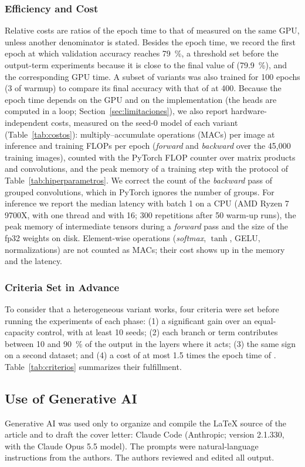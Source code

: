 \subsubsection{Efficiency and Cost} Relative costs are ratios of the epoch time to that of  measured on the same GPU, unless another denominator is stated. Besides the epoch time, we record the first epoch at which validation accuracy reaches 79~\%, a threshold set before the output-term experiments because it is close to the final value of  (79.9~\%), and the corresponding GPU time. A subset of variants was also trained for 100 epochs (3 of warmup) to compare its final accuracy with that of  at 400. Because the epoch time depends on the GPU and on the implementation (the heads are computed in a loop; Section~\ref{sec:limitaciones}), we also report hardware-independent costs, measured on the seed-0 model of each variant (Table~\ref{tab:costos}): multiply--accumulate operations (MACs) per image at inference and training FLOPs per epoch (\emph{forward} and \emph{backward} over the 45,000 training images), counted with the PyTorch FLOP counter over matrix products and convolutions, and the peak memory of a training step with the protocol of Table~\ref{tab:hiperparametros}. We correct the count of the \emph{backward} pass of grouped convolutions, which in PyTorch ignores the number of groups. For inference we report the median latency with batch 1 on a CPU (AMD Ryzen 7 9700X, with one thread and with 16; 300 repetitions after 50 warm-up runs), the peak memory of intermediate tensors during a \emph{forward} pass and the size of the fp32 weights on disk. Element-wise operations (\emph{softmax}, $\tanh$, GELU, normalizations) are not counted as MACs; their cost shows up in the memory and the latency.

\subsubsection{Criteria Set in Advance} To consider that a heterogeneous variant works, four criteria were set before running the experiments of each phase: (1) a significant gain over an equal-capacity control, with at least 10 seeds; (2) each branch or term contributes between 10 and 90~\% of the output in the layers where it acts; (3) the same sign on a second dataset; and (4) a cost of at most 1.5 times the epoch time of . Table~\ref{tab:criterios} summarizes their fulfillment.

\subsection{Use of Generative AI}
\label{sec:ia}
Generative AI was used only to organize and compile the \LaTeX{} source of the article and to draft the cover letter: Claude Code (Anthropic; version 2.1.330, with the Claude Opus 5.5 model). The prompts were natural-language instructions from the authors. The authors reviewed and edited all output.
